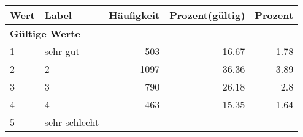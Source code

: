      \begin{longtable}{lXrrr}
     \toprule
     \textbf{Wert} & \textbf{Label} & \textbf{Häufigkeit} & \textbf{Prozent(gültig)} & \textbf{Prozent} \\
     \endhead
     \midrule
     \multicolumn{5}{l}{\textbf{Gültige Werte}}\\

     1 &
     \multicolumn{1}{X}{ sehr gut   } &


       \num{503} &
       \num[round-mode=places,round-precision=2]{16,67} &
         \num[round-mode=places,round-precision=2]{1,78} \\

     2 &
     \multicolumn{1}{X}{ 2   } &


       \num{1097} &
       \num[round-mode=places,round-precision=2]{36,36} &
         \num[round-mode=places,round-precision=2]{3,89} \\

     3 &
     \multicolumn{1}{X}{ 3   } &


       \num{790} &
       \num[round-mode=places,round-precision=2]{26,18} &
         \num[round-mode=places,round-precision=2]{2,8} \\

     4 &
     \multicolumn{1}{X}{ 4   } &


       \num{463} &
       \num[round-mode=places,round-precision=2]{15,35} &
         \num[round-mode=places,round-precision=2]{1,64} \\

     5 &
     \multicolumn{1}{X}{ sehr schlecht   } &



\end{longtable}
